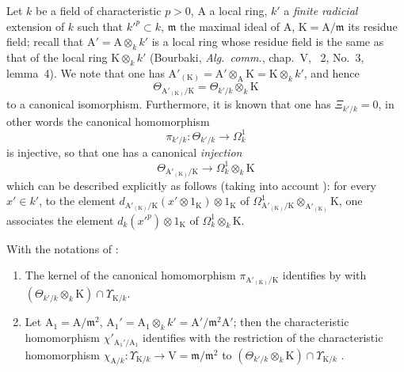 \begin{env}[22.5.5]
\label{0.22.5.5}
Let $k$ be a field of characteristic $p>0$, $\mathrm{A}$ a local ring, $k'$ a \emph{finite radicial} extension of $k$ such that $k'^p\subset k$, $\mathfrak{m}$ the maximal ideal of $\mathrm{A}$, $\mathrm{K}=\mathrm{A}/\mathfrak{m}$ its residue field; recall that $\mathrm{A}'=\mathrm{A}\otimes_kk'$ is a local ring whose residue field is the same as that of the local ring $\mathrm{K}\otimes_kk'$ (Bourbaki, \emph{Alg.~comm.}, chap.~V, \textsection~2, No.~3, lemma~4).
We note that one has $\mathrm{A}'_{(\mathrm{K})}=\mathrm{A}'\otimes_\mathrm{A}\mathrm{K}=\mathrm{K}\otimes_kk'$, and hence 
\[
\label{0.22.5.5.1}
  \Theta_{\mathrm{A}'_{(\mathrm{K})}/\mathrm{K}}=\Theta_{k'/k}\otimes_k\mathrm{K}
  \tag{22.5.5.1}
\]
to a canonical isomorphism.
Furthermore, it is known  that one has $\Xi_{k'/k}=0$, in other words the canonical homomorphism 
\[
  \pi_{k'/k}:\Theta_{k'/k}\to\Omega^1_k
\]
is injective, so that one has a canonical \emph{injection}
\[
\label{0.22.5.5.2}
  \Theta_{\mathrm{A}'_{(\mathrm{K})}/\mathrm{K}}\to\Omega^1_k\otimes_k\mathrm{K}
  \tag{22.5.5.2}
\]
which can be described explicitly as follows (taking into account ): for every $x'\in k'$, to the element $d_{\mathrm{A}'_{(\mathrm{K})}/\mathrm{K}}(x'\otimes 1_\mathrm{K})\otimes 1_\mathrm{K}$ of $\Omega^1_{\mathrm{A}'_{(\mathrm{K})}/\mathrm{K}}\otimes_{\mathrm{A}'_{(\mathrm{K})}}\mathrm{K}$, one associates the element $d_k(x'^p)\otimes 1_\mathrm{K}$ of $\Omega^1_k\otimes_k\mathrm{K}$.
\end{env}

\begin{lemma}[22.5.6]
\label{0.22.5.6}
With the notations of :
\begin{enumerate}
  \item[\rm{(i)}] The kernel of the canonical homomorphism $\pi_{\mathrm{A}'_{(\mathrm{K})}/\mathrm{K}}$  identifies by  with $(\Theta_{k'/k}\otimes_k\mathrm{K})\cap\Upsilon_{\mathrm{K}/k}$.
  \item[\rm{(ii)}] Let $\mathrm{A}_1=\mathrm{A}/\mathfrak{m}^2$, $\mathrm{A}_1'=\mathrm{A}_1\otimes_kk'=\mathrm{A}'/\mathfrak{m}^2\mathrm{A}'$; then the characteristic homomorphism $\chi'_{\mathrm{A}_1'/\mathrm{A}_1}$  identifies with the restriction of the characteristic homomorphism $\chi_{\mathrm{A}/k}:\Upsilon_{\mathrm{K}/k}\to\mathrm{V}=\mathfrak{m}/\mathfrak{m}^2$ to $(\Theta_{k'/k}\otimes_k\mathrm{K})\cap\Upsilon_{\mathrm{K}/k}$ .
\end{enumerate}
\end{lemma}

